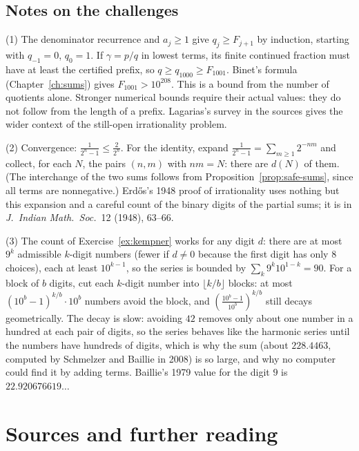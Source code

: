 \subsection*{Notes on the challenges}

(1) The denominator recurrence and $a_j\ge1$ give $q_j\ge F_{j+1}$ by induction, starting with $q_{-1}=0$, $q_0=1$.
If $\gamma=p/q$ in lowest terms, its finite continued fraction must have at least the certified prefix, so $q\ge q_{1000}\ge F_{1001}$.
Binet's formula (Chapter~\ref{ch:sums}) gives $F_{1001}>10^{208}$.
This is a bound from the number of quotients alone. Stronger numerical bounds require their actual values: they do not follow from the length of a prefix.
Lagarias's survey in the sources gives the wider context of the still-open irrationality problem.

(2) Convergence: $\frac1{2^n-1}\le\frac2{2^n}$. For the identity, expand $\frac1{2^n-1}=\sum_{m\ge1}2^{-nm}$ and collect, for each $N$, the pairs $(n,m)$ with $nm=N$:
there are $d(N)$ of them. (The interchange of the two sums follows from Proposition~\ref{prop:safe-sums}, since all terms are nonnegative.) Erd\H{o}s's 1948
proof of irrationality uses nothing but this expansion and a careful count of the binary digits of the partial sums; it is in \emph{J.\ Indian Math.\ Soc.}\ 12 (1948), 63--66.

(3) The count of Exercise~\ref{ex:kempner} works for any digit $d$: there are at most $9^k$ admissible $k$-digit numbers (fewer if $d\ne0$ because the first
digit has only $8$ choices), each at least $10^{k-1}$, so the series is bounded by $\sum_k9^k10^{1-k}=90$. For a block of $b$ digits, cut each $k$-digit number
into $\lfloor k/b\rfloor$ blocks: at most $(10^b-1)^{k/b}\cdot10^{b}$ numbers avoid the block, and $\left(\frac{10^b-1}{10^b}\right)^{k/b}$ still decays
geometrically. The decay is slow: avoiding $42$ removes only about one number in a hundred at each pair of digits, so the series behaves like the
harmonic series until the numbers have hundreds of digits, which is why the sum (about $228.4463$, computed by Schmelzer and Baillie in 2008) is so large, and why
no computer could find it by adding terms. Baillie's 1979 value for the digit $9$ is $22.920676619\ldots$

\section*{Sources and further reading}

